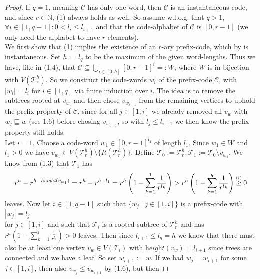 \documentclass[12pt]{article}
\newcommand{\up}[2]{\mathrel{\overset{\makebox[0pt]{\mbox{\normalfont\tiny #2}}}{#1}}}
\newcommand{\T}[0]{{\mathcal{T}_r^h}}
\newcommand{\he}[0]{\textit{height}}
\newenvironment{statement3}[3]{\begin{trivlist}
\item[\hskip \labelsep {\bfseries #1}\hskip \labelsep {\bfseries #2} {#3}\textbf{.}]}{\end{trivlist}}
\begin{document}
\begin{statement3}{(1.7)}{Theorem}{(Kraft's Inequality)}
    \begin{proof}
        If $q = 1$, meaning $\mathcal{C}$ has only one word, then $\mathcal{C}$ is an instantaneous code, and since $r \in \mathbb{N}$, (1) always holds
        as well.
        So assume w.l.o.g. that $q > 1$, $\forall i \in [1,q-1]: 0 < l_i \leq l_{i+1}$
        and that the code-alphabet of $\mathcal{C}$ is $[0,r-1]$ (we only need the alphabet to have $r$ elements).
        \\[10pt]
        We first show that (1) implies the existence of an $r$-ary prefix-code, which by
        \cite{ICT} is instantaneous.
        Set $h := l_q$ to be the maximum of the given word-lengths.
        Thus we have, like in (1.4), that $\mathcal{C} \subseteq \bigcup_{i \in [0,h]} [0,r-1]^i =: W$, where
        $W$ is in bijection with $V(\T)$.
        So we construct the code-words $w_i$ of the prefix-code $\mathcal{C}$, with $|w_i| = l_i$ for $i \in [1,q]$
        via finite induction over $i$. The idea is to remove the subtrees rooted at $v_{w_i}$ and then
        chose $v_{w_{i+1}}$ from the remaining vertices to uphold the prefix property of $\mathcal{C}$,
        since for all $j \in [1,i]$ we already removed all $v_{w}$ with $w_j \sqsubseteq w$ (see 1.6)
        before chosing $v_{w_{i+1}}$, so with $l_j \leq l_{i+1}$ we then know the prefix property still holds.\\[10pt]
        Let $i = 1$. Choose a code-word $w_1 \in [0,r-1]^{l_1}$ of length $l_1$. Since $w_1 \in W$ and $l_1 > 0$ we have
        $v_{w_1} \in V(\T) \setminus \{R(\T)\}$. Define $\mathcal{T}_0 := \T, \mathcal{T}_1 := \mathcal{T}_0 \setminus v_{w_1}$. We know
        from (1.3) that $\mathcal{T}_1$ has
        $$
            r^h - r^{h - \he(v_{w_1})} = r^h - r^{h - l_1} = r^h\left(1 - \sum_{k=1}^{1} \frac{1}{r^{l_k}}\right)
            > r^h\left(1 - \sum_{k=1}^{q} \frac{1}{r^{l_k}}\right) \up{\geq}{(1)} 0
        $$
        leaves. Now let $i \in [1,q-1]$ such that $\{w_j \mid j \in [1,i]\}$ is a prefix-code
        with $|w_j| = l_j$\\[2pt]
        for $j \in [1,i]$ and such that $\mathcal{T}_i$ is a rooted subtree of $\T$ and has $r^h(1 - \sum_{k=1}^{i}\frac{1}{r^{l_k}}) > 0$ leaves.
        Then since $l_{i+1} \leq l_q = h$ we know that there must also be at least one vertex
        $v_w \in V(\mathcal{T}_i)$ with $\he(v_w) = l_{i+1}$ since trees are connected and we have a leaf.
        So set $w_{i+1} := w$. If we had $w_j \sqsubseteq w_{i+1}$ for
        some $j \in [1,i]$, then also $v_{w_j} \leq v_{w_{i+1}}$ by (1.6), but then

\end{proof}
\end{statement3}
\end{document}
